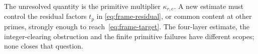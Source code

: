 The unresolved quantity is the primitive multiplier $\kappa_{r,c}$.
A new estimate must control the residual factors $t_p$ in
\eqref{eq:frame-residual}, or common content at other primes, strongly
enough to reach~\eqref{eq:frame-target}. The four-layer estimate,
the integer-clearing obstruction and the finite primitive failures
have different scopes; none closes that question.
